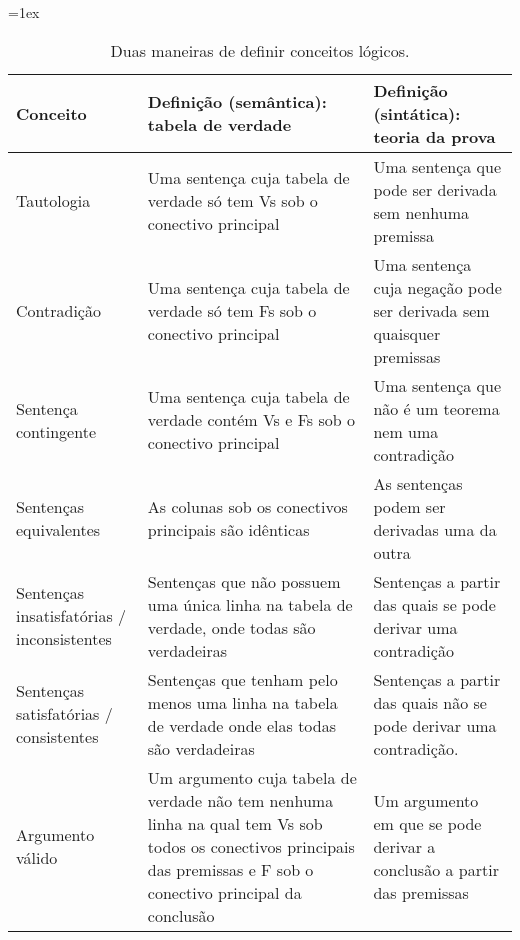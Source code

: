 \begin{sidewaystable}\small
\tabulinesep=1ex
\begin{tabu}{X[.5,c,m] ||X[1,l,m] |X[1,l,m]}
\textbf{Conceito} 		&	\textbf{Defini\c c\~ao (sem\^antica): tabela de verdade} 	&	\textbf{ Defini\c c\~ao  (sint\'atica):  teoria da prova} \\ \hline \hline

Tautologia  &	Uma senten\c ca cuja tabela de verdade s\'o tem Vs sob o conectivo principal  & Uma senten\c ca que pode ser derivada sem nenhuma premissa	 \\ \hline
 
Contradi\c c\~ao		&	Uma senten\c ca cuja tabela de verdade s\'o tem Fs sob o conectivo principal  &	Uma senten\c ca cuja nega\c c\~ao pode ser derivada sem quaisquer premissas\\ \hline

Senten\c ca contingente	&	Uma senten\c ca cuja tabela de verdade cont\'em Vs e Fs sob o  conectivo principal & Uma senten\c ca que n\~ao \'e um teorema nem uma contradi\c c\~ao \\ \hline

Senten\c cas equivalentes  &	As colunas sob os conectivos principais s\~ao id\^enticas & As senten\c cas podem ser derivadas uma da outra	\\ \hline

Senten\c cas  insatisfat\'orias / inconsistentes	&	Senten\c cas que n\~ao possuem uma \'unica linha na tabela de verdade, onde todas s\~ao verdadeiras	& Senten\c cas a partir das quais se pode derivar uma contradi\c c\~ao \\ \hline

Senten\c cas  satisfat\'orias  / consistentes	&	Senten\c cas que tenham pelo menos uma linha na tabela de verdade onde elas todas s\~ao verdadeiras & Senten\c cas  a partir das quais n\~ao se pode derivar uma contradi\c c\~ao.	\\ \hline

Argumento v\'alido 		&	Um argumento cuja tabela de verdade n\~ao tem  nenhuma linha  na qual  tem Vs sob todos os conectivos principais das premissas e F sob o conectivo principal da conclus\~ao  & Um argumento em que se pode derivar a conclus\~ao a partir das premissas	\\ 
\end{tabu}
\caption{Duas maneiras de definir conceitos l\'ogicos.}
\label{table:truth_tables_or_derivations}
\end{sidewaystable}


